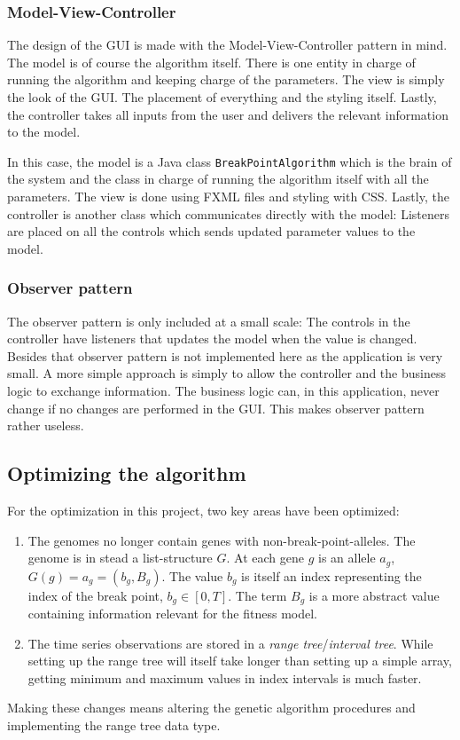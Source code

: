 \subsubsection{Model-View-Controller}

The design of the GUI is made with the Model-View-Controller pattern in mind.
The model is of course the algorithm itself. There is one entity in charge of
running the algorithm and keeping charge of the parameters. The view is simply
the look of the GUI. The placement of everything and the styling itself. Lastly,
the controller takes all inputs from the user and delivers the relevant
information to the model. 

In this case, the model is a Java class \texttt{BreakPointAlgorithm} which is
the brain of the system and the class in charge of running the algorithm itself
with all the parameters. The view is done using FXML files and styling
with CSS. Lastly, the controller is another class which communicates directly
with the model: Listeners are placed on all the controls which sends updated
parameter values to the model. 

\subsubsection{Observer pattern}

The observer pattern is only included at a small scale: The controls in the
controller have listeners that updates the model when the value is changed.
Besides that observer pattern is not implemented here as the application is very
small. A more simple approach is simply to allow the controller and the business
logic to exchange information. The business logic can, in this application,
never change if no changes are performed in the GUI. This makes observer pattern
rather useless. 


\subsection{Optimizing the algorithm} \label{sec:optimized-algorithm}

For the optimization in this project, two key areas have been optimized: 
\begin{enumerate}
    \item The genomes no longer contain genes with non-break-point-alleles. The
    genome is in stead a list-structure $G$. At each gene $g$ is an allele
    $a_g$, $G(g) = a_g = (b_g, B_g)$. The value $b_g$ is itself an index
    representing the index of the break point, $b_g \in [0, T]$. The term $B_g$
    is a more abstract value containing information relevant for the fitness
    model. 
    
    \item The time series observations are stored in a \textit{range
    tree}/\textit{interval tree}. While setting up the range tree will itself
    take longer than setting up a simple array, getting minimum and maximum
    values in index intervals is much faster. 
\end{enumerate}
Making these changes means altering the genetic algorithm procedures and
implementing the range tree data type. 



